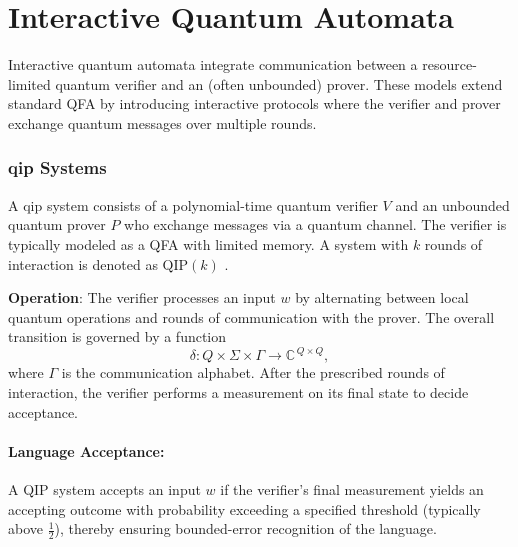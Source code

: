 \section{Interactive Quantum Automata}
\label{sec:interactive-quantum}

Interactive quantum automata integrate communication between a resource-limited quantum verifier and an (often unbounded) prover. These models extend standard QFA by introducing interactive protocols where the verifier and prover exchange quantum messages over multiple rounds.

\subsubsection{\gls{qip} Systems}
\label{sssec:qip}
\begin{definition}
A \gls{qip} system consists of a polynomial-time quantum verifier \( V \) and an unbounded quantum prover \( P \) who exchange messages via a quantum channel. The verifier is typically modeled as a QFA with limited memory. A system with \( k \) rounds of interaction is denoted as \(\text{QIP}(k)\) \cite{nishimura2009application, zheng2015power}.
\end{definition}

\textbf{Operation}:  
The verifier processes an input \( w \) by alternating between local quantum operations and rounds of communication with the prover. The overall transition is governed by a function
\[
\delta: Q \times \Sigma \times \Gamma \to \mathbb{C}^{\, Q \times Q},
\]
where \( \Gamma \) is the communication alphabet. After the prescribed rounds of interaction, the verifier performs a measurement on its final state to decide acceptance.

\paragraph{Language Acceptance:}  
A QIP system accepts an input \( w \) if the verifier’s final measurement yields an accepting outcome with probability exceeding a specified threshold (typically above \( \frac{1}{2} \)), thereby ensuring bounded-error recognition of the language.

